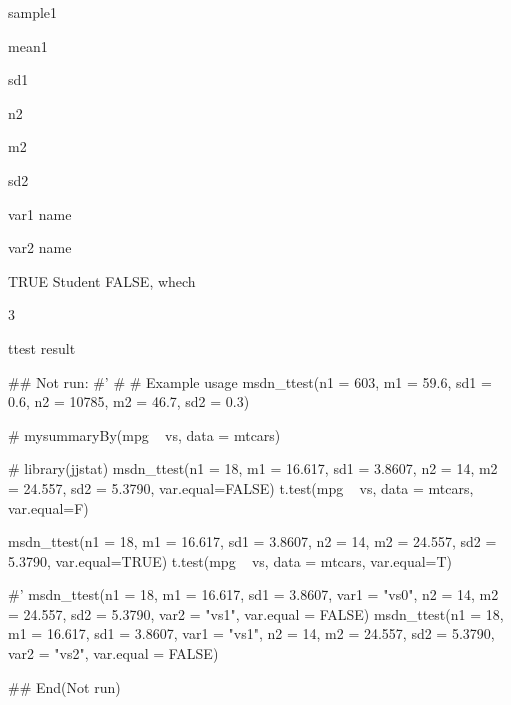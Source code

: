 \documentclass[a4paper]{book}
\begin{document}
\begin{Arguments}
\begin{ldescription}
\item[\code{n1}] sample1

\item[\code{m1}] mean1

\item[\code{sd1}] sd1

\item[\code{n2}] n2

\item[\code{m2}] m2

\item[\code{sd2}] sd2

\item[\code{var1}] var1 name

\item[\code{var2}] var2 name

\item[\code{var.equal}] TRUE Student FALSE, whech

\item[\code{digits}] 3
\end{ldescription}
\end{Arguments}
%
\begin{Value}
ttest result
\end{Value}
%
\begin{Examples}
\begin{ExampleCode}

\#\# Not run: 
#'
# # Example usage
msdn_ttest(n1 = 603, m1 = 59.6, sd1 = 0.6,
           n2 = 10785, m2 = 46.7, sd2 = 0.3)

#  mysummaryBy(mpg ~ vs, data = mtcars)

# library(jjstat)
msdn_ttest(n1 = 18, m1 = 16.617, sd1 = 3.8607,
           n2 = 14, m2 = 24.557, sd2 = 5.3790,  var.equal=FALSE)
t.test(mpg ~ vs, data = mtcars, var.equal=F)%

msdn_ttest(n1 = 18, m1 = 16.617, sd1 = 3.8607,
           n2 = 14, m2 = 24.557, sd2 = 5.3790, var.equal=TRUE)
t.test(mpg ~ vs, data = mtcars, var.equal=T)%

#'
msdn_ttest(n1 = 18, m1 = 16.617, sd1 = 3.8607, var1 = "vs0",
           n2 = 14, m2 = 24.557, sd2 = 5.3790, var2 = "vs1", var.equal = FALSE)
msdn_ttest(n1 = 18, m1 = 16.617, sd1 = 3.8607, var1 = "vs1",
           n2 = 14, m2 = 24.557, sd2 = 5.3790, var2 = "vs2", var.equal = FALSE)



## End(Not run)

\end{ExampleCode}
\end{Examples}
\end{document}
